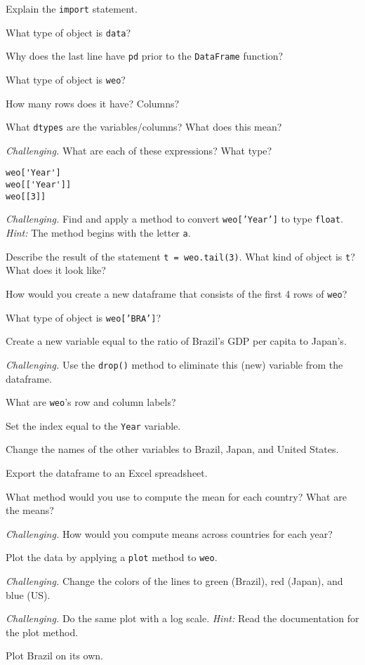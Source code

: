 \documentclass[11pt]{exam}
\begin{document}
\begin{questions}
\begin{parts}
\item Explain the \texttt{import} statement.
\item What type of object is {\tt data}?
\item Why does the last line have {\tt pd} prior to the {\tt DataFrame} function?
\item What type of object is {\tt weo}?
\item How many rows does it have?  Columns?
\item What {\tt dtypes} are the variables/columns?  What does this mean?
\item {\it Challenging.\/}
What are each of these expressions?  What type?
\begin{verbatim}
weo['Year']
weo[['Year']]
weo[[3]]
\end{verbatim}
\item {\it Challenging.\/}
Find and apply a method to convert {\tt weo['Year']} to type {\tt float}.
{\it Hint:\/} The method begins with the letter {\tt a}.
\item Describe the result of the statement \texttt{t = weo.tail(3)}.
What kind of object is \texttt{t}?  What does it look like?
\item How would you create a new dataframe that consists of the first 4 rows of \texttt{weo}?
\item What type of object is \texttt{weo['BRA']}?
\item Create a new variable equal to the ratio of Brazil's GDP per capita to Japan's.
\item {\it Challenging.\/}
Use the {\tt drop()} method to eliminate this (new) variable from the dataframe.
\item What are {\tt weo}'s row and column labels?
\item Set the index equal to the {\tt Year} variable.
\item Change the names of the other variables to Brazil, Japan, and United States.
\item Export the dataframe to an Excel spreadsheet.
\item What method would you use to compute the mean for each country?
What are the means?
\item {\it Challenging.\/}
How would you compute means across countries for each year?
\item Plot the data by applying a {\tt plot} method to {\tt weo}.
\item {\it Challenging.\/} Change the colors of the lines to green (Brazil), red (Japan),
and blue (US).
\item {\it Challenging.\/}
Do the same plot with a log scale.
{\it Hint:\/} Read the documentation for the plot method.
\item Plot Brazil on its own.
\end{parts}


\end{questions}
\end{document}
